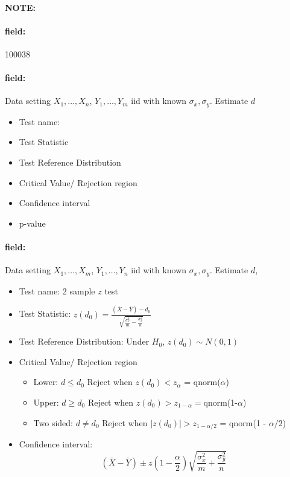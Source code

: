 \documentclass[12pt]{article}
\newenvironment{note}{\paragraph{NOTE:}}{}
\newenvironment{field}{\paragraph{field:}}{}
\begin{document}
\begin{note} \begin{field} \tiny 100038 \end{field}
 \begin{field}
  Data setting $X_1, \ldots , X_n$, $Y_1, \ldots, Y_m$ iid with known $\sigma_x, \sigma_y$. Estimate $d$
  \begin{itemize}
   \item Test name:
   \item Test Statistic
   \item Test Reference Distribution
   \item Critical Value/ Rejection region
   \item Confidence interval
   \item p-value
  \end{itemize}
 \end{field}
 \begin{field}
  Data setting $X_1, \ldots , X_m$, $Y_1, \ldots, Y_n$ iid with known $\sigma_x, \sigma_y$. Estimate $d$,
  \begin{itemize}
   \item Test name: 2 sample $z$ test
   \item Test Statistic: $z(d_0) = \frac{(\bar{X}- \bar{Y}) - d_0}{\sqrt{\frac{\sigma_x^2}{m} - \frac{\sigma_y^2}{n}}}$
   \item Test Reference Distribution: Under $H_0$, $z(d_0) \sim N(0,1)$
   \item Critical Value/ Rejection region
         \begin{itemize}
          \item Lower: $d \leq d_0$ Reject when $z(d_0) < z_{\alpha}$ = qnorm($\alpha$)
          \item Upper: $d \geq d_0$ Reject when $z(d_0) > z_{1 - \alpha} = $qnorm(1-$\alpha$)
          \item Two sided: $d \neq d_0$ Reject when $|z(d_0)| > z_{1 - \alpha/2}$ = qnorm(1 - $\alpha/2$)
         \end{itemize}
   \item Confidence interval: $$ (\bar{X} - \bar{Y}) \pm z(1 - \frac{\alpha}{2})\sqrt{\frac{\sigma_x^2}{m} + \frac{\sigma_y^2}{n}} $$
  \end{itemize}
 \end{field}
\end{note}
\end{document}
